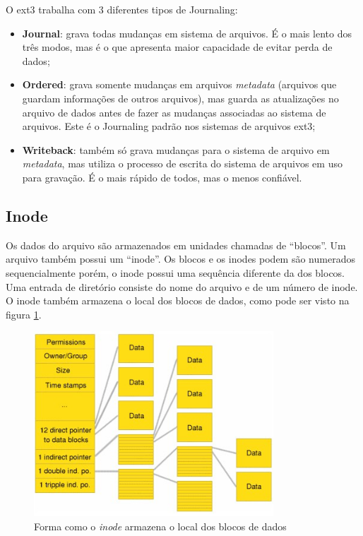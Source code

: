 O ext3 trabalha com 3 diferentes tipos de Journaling:

\begin{itemize}
	\item \textbf{Journal}: grava todas mudanças em sistema de arquivos. É o mais lento dos três modos, mas é o que apresenta maior capacidade de evitar perda de dados;
	\item \textbf{Ordered}: grava somente mudanças em arquivos \emph{metadata} (arquivos que guardam informações de outros arquivos), mas guarda as atualizações no arquivo de dados antes de fazer as mudanças associadas ao sistema de arquivos. Este é o Journaling padrão nos sistemas de arquivos ext3;
	\item \textbf{Writeback}: também só grava mudanças para o sistema de arquivo em \emph{metadata}, mas utiliza o processo de escrita do sistema de arquivos em uso para gravação. É o mais rápido de todos, mas o menos confiável.
\end{itemize}

\subsection{Inode}

Os dados do arquivo são armazenados em unidades chamadas de ``blocos''. Um arquivo também possui um ``inode''. Os blocos e os inodes podem são numerados sequencialmente porém, o inode possui uma sequência diferente da dos blocos. Uma entrada de diretório consiste do nome do arquivo e de um número de inode. O inode também armazena o local dos blocos de dados, como pode ser visto na figura \ref{fig:inode}.

\begin{figure}
	\centering
	\includegraphics[width=0.8\textwidth]{sistemas_de_arquivos/fig/inode.jpg}
	\caption{Forma como o \emph{inode} armazena o local dos blocos de dados}
	\label{fig:inode}
\end{figure}

